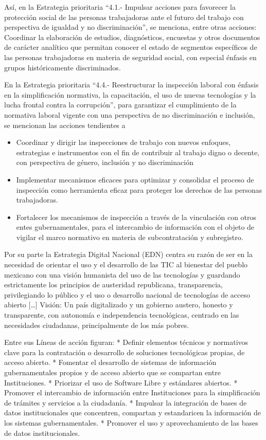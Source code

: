 \documentclass[
]{article}
\providecommand{\tightlist}{%
  \setlength{\itemsep}{0pt}\setlength{\parskip}{0pt}}
\begin{document}
Así, en la Estrategia prioritaria ``4.1.- Impulsar acciones para favorecer la protección social de las personas trabajadoras ante el futuro del trabajo con perspectiva de igualdad y no discriminación'', se menciona, entre otras acciones: Coordinar la elaboración de estudios, diagnósticos, encuestas y otros documentos de carácter analítico que permitan conocer el estado de segmentos específicos de las personas trabajadoras en materia de seguridad social, con especial énfasis en grupos históricamente discriminados.

En la Estrategia prioritaria ``4.4.- Reestructurar la inspección laboral con énfasis en la simplificación normativa, la capacitación, el uso de nuevas tecnologías y la lucha frontal contra la corrupción'', para garantizar el cumplimiento de la normativa laboral vigente con una perspectiva de no discriminación e inclusión, se mencionan las acciones tendientes a

\begin{itemize}
\tightlist
\item
  Coordinar y dirigir las inspecciones de trabajo con nuevos enfoques, estrategias e instrumentos con el fin de contribuir al trabajo digno o decente, con perspectiva de género, inclusión y no discriminación
\item
  Implementar mecanismos eficaces para optimizar y consolidar el proceso de inspección como herramienta eficaz para proteger los derechos de las personas trabajadoras.
\item
  Fortalecer los mecanismos de inspección a través de la vinculación con otros entes gubernamentales, para el intercambio de información con el objeto de vigilar el marco normativo en materia de subcontratación y subregistro.
\end{itemize}

Por su parte la Estrategia Digital Nacional (EDN) centra su razón de ser en la necesidad de orientar el uso y el desarrollo de las TIC al bienestar del pueblo mexicano con una visión humanista del uso de las tecnologías y guardando estrictamente los principios de austeridad republicana, transparencia, privilegiando lo público y el uso o desarrollo nacional de tecnologías de acceso abierto {[}\ldots{]} Visión: Un país digitalizado y un gobierno austero, honesto y transparente, con autonomía e independencia tecnológicas, centrado en las necesidades ciudadanas, principalmente de los más pobres.

Entre sus Líneas de acción figuran:
* Definir elementos técnicos y normativos clave para la contratación o desarrollo de soluciones tecnológicas propias, de acceso abierto.
* Fomentar el desarrollo de sistemas de información gubernamentales propios y de acceso abierto que se compartan entre Instituciones.
* Priorizar el uso de Software Libre y estándares abiertos.
* Promover el intercambio de información entre Instituciones para la simplificación de trámites y servicios a la ciudadanía.
* Impulsar la integración de bases de datos institucionales que concentren, compartan y estandaricen la información de los sistemas gubernamentales.
* Promover el uso y aprovechamiento de las bases de datos institucionales.
\end{document}
